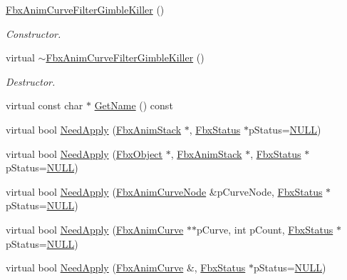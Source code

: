 \begin{DoxyCompactItemize}
\item 
\hyperlink{class_fbx_anim_curve_filter_gimble_killer_ae0a235ecc70b252fa50eb742727d4282}{Fbx\+Anim\+Curve\+Filter\+Gimble\+Killer} ()
\begin{DoxyCompactList}\small\item\em Constructor. \end{DoxyCompactList}\item 
virtual \hyperlink{class_fbx_anim_curve_filter_gimble_killer_ae4ac4f6824d0065e71139b985e8197b3}{$\sim$\+Fbx\+Anim\+Curve\+Filter\+Gimble\+Killer} ()
\begin{DoxyCompactList}\small\item\em Destructor. \end{DoxyCompactList}\item 
virtual const char $\ast$ \hyperlink{class_fbx_anim_curve_filter_gimble_killer_a224d34ab4b2a7f508de5679402c3711f}{Get\+Name} () const
\item 
virtual bool \hyperlink{class_fbx_anim_curve_filter_gimble_killer_a3b303b3383e638e445e0bd17570be9ea}{Need\+Apply} (\hyperlink{class_fbx_anim_stack}{Fbx\+Anim\+Stack} $\ast$, \hyperlink{class_fbx_status}{Fbx\+Status} $\ast$p\+Status=\hyperlink{fbxarch_8h_a070d2ce7b6bb7e5c05602aa8c308d0c4}{N\+U\+LL})
\item 
virtual bool \hyperlink{class_fbx_anim_curve_filter_gimble_killer_ad12554a479bc7a7cfd2fba457b051a5f}{Need\+Apply} (\hyperlink{class_fbx_object}{Fbx\+Object} $\ast$, \hyperlink{class_fbx_anim_stack}{Fbx\+Anim\+Stack} $\ast$, \hyperlink{class_fbx_status}{Fbx\+Status} $\ast$p\+Status=\hyperlink{fbxarch_8h_a070d2ce7b6bb7e5c05602aa8c308d0c4}{N\+U\+LL})
\item 
virtual bool \hyperlink{class_fbx_anim_curve_filter_gimble_killer_a72a761452f1a110353be0b6cae920e24}{Need\+Apply} (\hyperlink{class_fbx_anim_curve_node}{Fbx\+Anim\+Curve\+Node} \&p\+Curve\+Node, \hyperlink{class_fbx_status}{Fbx\+Status} $\ast$p\+Status=\hyperlink{fbxarch_8h_a070d2ce7b6bb7e5c05602aa8c308d0c4}{N\+U\+LL})
\item 
virtual bool \hyperlink{class_fbx_anim_curve_filter_gimble_killer_a7d9f7e30d2c8e4ec21e947ef0efaa314}{Need\+Apply} (\hyperlink{class_fbx_anim_curve}{Fbx\+Anim\+Curve} $\ast$$\ast$p\+Curve, int p\+Count, \hyperlink{class_fbx_status}{Fbx\+Status} $\ast$p\+Status=\hyperlink{fbxarch_8h_a070d2ce7b6bb7e5c05602aa8c308d0c4}{N\+U\+LL})
\item 
virtual bool \hyperlink{class_fbx_anim_curve_filter_gimble_killer_a136dadcee53ebed6b5afc6abddfcf402}{Need\+Apply} (\hyperlink{class_fbx_anim_curve}{Fbx\+Anim\+Curve} \&, \hyperlink{class_fbx_status}{Fbx\+Status} $\ast$p\+Status=\hyperlink{fbxarch_8h_a070d2ce7b6bb7e5c05602aa8c308d0c4}{N\+U\+LL})
$$
\end{DoxyCompactItemize}
